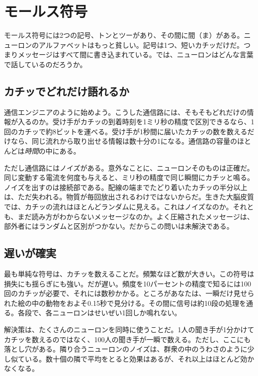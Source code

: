 \chapter{モールス符号}

モールス符号には2つの記号、トンとツーがあり、その間に間（ま）がある。ニューロンのアルファベットはもっと貧しい。記号は1つ、短いカチッだけだ。つまりメッセージはすべて間に書き込まれている。では、ニューロンはどんな言葉で話しているのだろうか。

\section*{カチッでどれだけ語れるか}

通信エンジニアのように始めよう。こうした通信路には、そもそもどれだけの情報が入るのか。受け手がカチッの到着時刻を1ミリ秒の精度で区別できるなら、1回のカチッで約8ビットを運べる。受け手が1秒間に届いたカチッの数を数えるだけなら、同じ流れから取り出せる情報は数十分の1になる。通信路の容量のほとんどは\emph{時間}の中にある。


ただし通信路にはノイズがある。意外なことに、ニューロンそのものは正確だ。同じ変動する電流を何度も与えると、ミリ秒の精度で同じ瞬間にカチッと鳴る。ノイズを出すのは接続部である。配線の端までたどり着いたカチッの半分以上は、ただ失われる。物質が毎回放出されるわけではないからだ。生きた大脳皮質では、カチッの流れはほとんどランダムに見える。これはノイズなのか。それとも、まだ読み方がわからないメッセージなのか。よく圧縮されたメッセージは、部外者にはランダムと区別がつかない。だからこの問いは未解決である。

\section*{遅いが確実}

最も単純な符号は、カチッを数えることだ。頻繁なほど数が大きい。この符号は損失にも揺らぎにも強い。だが遅い。頻度を10パーセントの精度で知るには100回のカチッが必要で、それには数秒かかる。ところがあなたは、一瞬だけ見せられた絵の中の動物をおよそ0.15秒で見分ける。その間に信号は約10段の処理を通る。各段で、各ニューロンはせいぜい1回しか鳴れない。

解決策は、たくさんのニューロンを同時に使うことだ。1人の聞き手が1分かけてカチッを数えるのではなく、100人の聞き手が一瞬で数える。ただし、ここにも落とし穴がある。隣り合うニューロンのノイズは、群衆の中のうわさのように少し似ている。数十個の隣で平均をとると効果はあるが、それ以上はほとんど効かなくなる。


